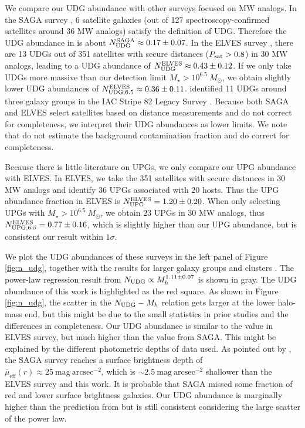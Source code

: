 \documentclass[twocolumn,astrosymb,twocolappendix]{aastex631}
\newcommand{\sbunit}{\mathrm{mag\ arcsec}^{-2}}
\newcommand{\sbeffr}{\overline{\mu}_{\mathrm{eff}}(r)}
\begin{document}
\begin{CJK*}{UTF8}{gbsn}
We compare our UDG abundance with other surveys focused on MW analogs. In the SAGA survey \citep{SAGA-II}, 6 satellite galaxies (out of 127 spectroscopy-confirmed satellites around 36 MW analogs) satisfy the definition of UDG. Therefore the UDG abundance in \citet{SAGA-II} is about $N_{\rm UDG}^{\rm SAGA}\approx 0.17\pm0.07$. In the ELVES survey \citep{CarlstenELVES2022}, there are 13 UDGs out of 351 satellites with secure distances ($P_{\rm sat} > 0.8$) in 30 MW analogs, leading to a UDG abundance of $N_{\rm UDG}^{\rm ELVES} \approx 0.43\pm0.12$. If we only take UDGs more massive than our detection limit $M_\star > 10^{6.5}\ M_\odot$, we obtain slightly lower UDG abundances of $N_{\rm UDG, 6.5}^{\rm ELVES} \approx 0.36\pm0.11$. \citet{Roman2017b} identified 11 UDGs around three galaxy groups in the IAC Stripe 82 Legacy Survey \citep{Fliri2016}. Because both SAGA and ELVES select satellites based on distance measurements and do not correct for completeness, we interpret their UDG abundances as lower limits. We note that \citet{Roman2017b} do not estimate the background contamination fraction and do correct for completeness. 

Because there is little literature on UPGs, we only compare our UPG abundance with ELVES. In ELVES, we take the 351 satellites with secure distances in 30 MW analogs and identify 36 UPGs associated with 20 hosts. Thus the UPG abundance fraction in ELVES is $N_{\rm UPG}^{\rm ELVES} = 1.20 \pm 0.20$. When only selecting UPGs with $M_\star > 10^{6.5}\ M_\odot$, we obtain 23 UPGs in 30 MW analogs, thus $N_{\rm UPG, 6.5}^{\rm ELVES} = 0.77 \pm 0.16$, which is slightly higher than our UPG abundance, but is consistent our result within $1\sigma$. 


We plot the UDG abundances of these surveys in the left panel of Figure \ref{fig:n_udg}, together with the results for larger galaxy groups and clusters \citep{Koda2015,Munoz2015,Roman2017a,Roman2017b,Janssens2017,vdBurg2017}. 
The power-law regression result from \citet{vdBurg2017} $N_{\rm UDG} \propto M_h^{1.11\pm 0.07}$ is shown in gray. The UDG abundance of this work is highlighted as the red square. As shown in Figure \ref{fig:n_udg}, the scatter in the $N_{\rm UDG}-M_h$ relation gets larger at the lower halo-mass end, but this might be due to the small statistics in prior studies and the differences in completeness. Our UDG abundance is similar to the value in ELVES survey, but much higher than the value from SAGA. This might be explained by the different photometric depths of data used. As pointed out by \citet{CarlstenELVES2022,Font2022}, the SAGA survey reaches a surface brightness depth of $\sbeffr\approx 25\ \sbunit$, which is $\sim 2.5\ \sbunit$ shallower than the ELVES survey and this work. It is probable that SAGA missed some fraction of red and lower surface brightness galaxies. Our UDG abundance is marginally higher than the prediction from \citet{vdBurg2017} but is still consistent considering the large scatter of the power law. 


\end{CJK*}
\end{document}
